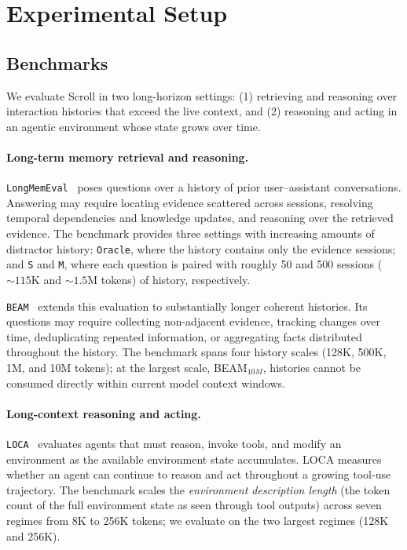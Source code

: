\section{Experimental Setup}
\label{sec:setup}

\subsection{Benchmarks}
\label{sec:setup-benchmarks}

We evaluate Scroll in two long-horizon settings:
(1) retrieving and reasoning over interaction histories that exceed the live context, and (2) reasoning and acting in an agentic environment whose state grows over time.

\paragraph{Long-term memory retrieval and reasoning.}
\texttt{LongMemEval}~\citep{wu2025longmemeval} poses questions over a history of prior user--assistant conversations. Answering may require locating evidence scattered across sessions, resolving temporal dependencies and knowledge updates, and reasoning over the retrieved evidence. The benchmark provides three settings with increasing amounts of distractor history: \texttt{Oracle}, where the history contains only the evidence sessions; and \texttt{S} and \texttt{M}, where each question is paired with roughly 50 and 500 sessions (${\sim}115$K and ${\sim}1.5$M tokens) of history, respectively.

\texttt{BEAM}~\citep{beam} extends this evaluation to substantially longer coherent histories. Its questions may require collecting non-adjacent evidence, tracking changes over time, deduplicating repeated information, or aggregating facts distributed throughout the history. The benchmark spans four history scales (128K, 500K, 1M, and 10M tokens); at the largest scale, BEAM$_{10M}$, histories cannot be consumed directly within current model context windows.

\paragraph{Long-context reasoning and acting.}
\texttt{LOCA}~\citep{zeng2026loca} evaluates agents that must reason, invoke tools, and modify an environment as the available environment state accumulates. LOCA measures whether an agent can continue to reason and act throughout a growing tool-use trajectory. The benchmark scales the \emph{environment description length} (the token count of the full environment state as seen through tool outputs) across seven regimes from 8K to 256K tokens; we evaluate on the two largest regimes (128K and 256K).



